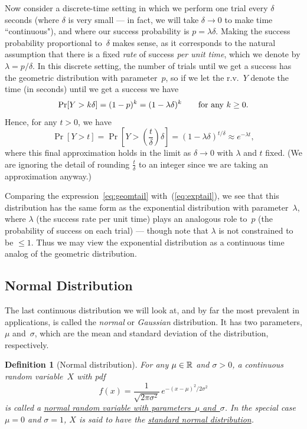 \documentclass[11pt]{article}
\def\ul#1{\underline{#1}}
\newcounter{thm}
\newtheorem{definition}{Definition}[thm]
\begin{document}
Now consider a discrete-time setting in which we perform one trial every $\delta$ seconds
(where $\delta$ is very small --- in fact, we will take $\delta\to 0$ to make time ``continuous"),
and where our success probability is $p=\lambda\delta$.
Making the success probability proportional to~$\delta$ makes sense, as it corresponds to
the natural assumption that there is a fixed {\it rate\/} of success {\it per unit time\/},
which we denote by $\lambda = p/\delta$.  In this discrete setting, the number of trials until we get a success
has the geometric distribution with parameter~$p$, so if we let the r.v.~$Y$ denote the
time (in seconds) until we get a success we have $$
   \Pr[Y> k\delta] = (1-p)^k = (1-\lambda\delta)^k \qquad\hbox{\rm for any $k\ge 0$}.  $$
Hence, for any $t>0$, we have
\begin{equation}\label{eq:geomtail}
   \Pr[Y> t] = \Pr[Y>({\textstyle\frac{t}{\delta}})\delta] = (1-\lambda\delta)^{t/\delta}
           \approx e^{-\lambda t},
\end{equation}
where this final approximation holds in the limit as $\delta\to 0$ with $\lambda$ and $t$
fixed.  (We are ignoring the detail of rounding $\frac{t}{\delta}$ to an integer since we
are taking an approximation anyway.)

Comparing the expression~\eqref{eq:geomtail} with~(\ref{eq:exptail}), we see that this distribution has the
same form as the exponential distribution with parameter~$\lambda$, where $\lambda$
(the success rate per unit time) plays an analogous role to~$p$ (the probability of success
on each trial) --- though note that $\lambda$ is not constrained to be $\le 1$.  Thus we may view
the exponential distribution as a continuous time analog of the geometric distribution.

\subsection*{Normal Distribution}

The last continuous distribution we will look at, and by far the
most prevalent in applications, is called the
{\it normal\/} or {\it Gaussian\/} distribution.  It has two parameters, $\mu$ and~$\sigma$,
which are the mean and standard deviation of the distribution, respectively.

\begin{definition}[Normal distribution]
For any $\mu \in \mathbb{R}$ and $\sigma> 0$, a continuous random variable~$X$
with pdf $$
   f(x) = \frac{1}{\sqrt{2\pi\sigma^2}} \,e^{-(x-\mu)^2/2\sigma^2}  $$
is called a \ul{normal random variable with parameters~$\mu$ and~$\sigma$}.
In the special case $\mu=0$ and $\sigma=1$, $X$ is said to have the
\ul{standard normal distribution}.
\end{definition}
\end{document}
